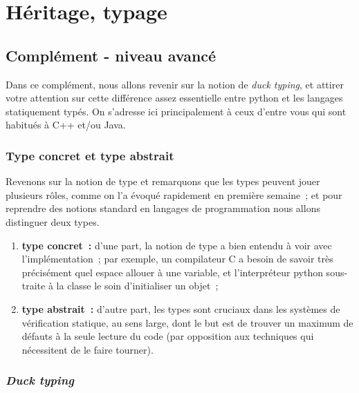     \hypertarget{huxe9ritage-typage}{%
\section{Héritage, typage}\label{huxe9ritage-typage}}

    \hypertarget{compluxe9ment---niveau-avancuxe9}{%
\subsection{Complément - niveau
avancé}\label{compluxe9ment---niveau-avancuxe9}}

    Dans ce complément, nous allons revenir sur la notion de \emph{duck
typing}, et attirer votre attention sur cette différence assez
essentielle entre python et les langages statiquement typés. On
s'adresse ici principalement à ceux d'entre vous qui sont habitués à C++
et/ou Java.

    \hypertarget{type-concret-et-type-abstrait}{%
\subsubsection{Type concret et type
abstrait}\label{type-concret-et-type-abstrait}}

    Revenons sur la notion de type et remarquons que les types peuvent jouer
plusieurs rôles, comme on l'a évoqué rapidement en première semaine~; et
pour reprendre des notions standard en langages de programmation nous
allons distinguer deux types.

\begin{enumerate}
\def\labelenumi{\arabic{enumi}.}
\tightlist
\item
  \textbf{type concret~:} d'une part, la notion de type a bien entendu à
  voir avec l'implémentation~; par exemple, un compilateur C a besoin de
  savoir très précisément quel espace allouer à une variable, et
  l'interpréteur python sous-traite à la classe le soin d'initialiser un
  objet~;
\item
  \textbf{type abstrait~:} d'autre part, les types sont cruciaux dans
  les systèmes de vérification statique, au sens large, dont le but est
  de trouver un maximum de défauts à la seule lecture du code (par
  opposition aux techniques qui nécessitent de le faire tourner).
\end{enumerate}

    \hypertarget{duck-typing}{%
\subsubsection{\texorpdfstring{\emph{Duck
typing}}{Duck typing}}\label{duck-typing}}

